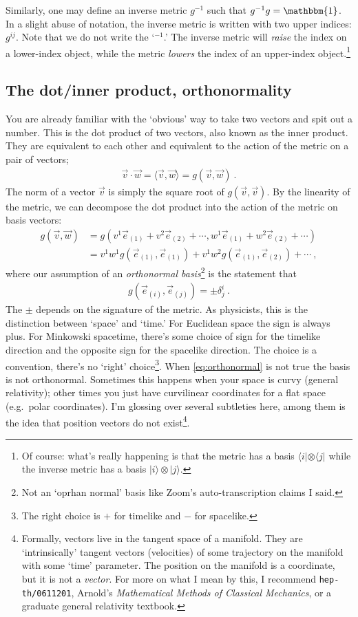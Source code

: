 Similarly, one may define an inverse metric $g^{-1}$ such that $g^{-1}g = \mathbbm{1}$. In a slight abuse of notation, the inverse metric is written with two upper indices: $g^{ij}$. Note that we do not write the `$^{-1}$.' The inverse metric will \emph{raise} the index on a lower-index object, while the metric \emph{lowers} the index of an upper-index object.\footnote{Of course: what’s really happening is that the metric has a basis $\langle i|\otimes \langle j|$ while the inverse metric has a basis $|i\rangle \otimes |j\rangle$.}


\subsection{The dot/inner product, orthonormality}

You are already familiar with the `obvious' way to take two vectors and spit out a number. This is the dot product of two vectors, also known as the inner product. They are equivalent to each other and equivalent to the action of the metric on a pair of vectors;
\begin{align}
  \vec v\cdot \vec w = \langle \vec v, \vec w \rangle = g(\vec v, \vec w) \ .
\end{align}
The norm of a vector $\vec v$ is simply the square root of $g(\vec v, \vec v)$. 
%
By the linearity of the metric, we can decompose the dot product into the action of the metric on basis vectors:
\begin{align}
  g(\vec v, \vec w) &= 
  g(
    v^1\vec e_{(1)} + v^2\vec e_{(2)} + \cdots,
    w^1\vec e_{(1)} + w^2\vec e_{(2)} + \cdots
  )
  \\
  &=
  v^1 w^1 g(\vec e_{(1)}, \vec e_{(1)}) + 
  v^1 w^2 g(\vec e_{(1)}, \vec e_{(2)}) + \cdots \ ,
\end{align}
where our assumption of an \emph{orthonormal basis}\footnote{Not an `oprhan normal' basis like Zoom's auto-transcription claims I said.} is the statement that
\begin{align}
  g(\vec e_{(i)}, \vec e_{(j)}) = \pm \delta^i_j \ .
  \label{eq:orthonormal}
\end{align}
The $\pm$ depends on the signature of the metric. As physicists, this is the distinction between `space' and `time.' For Euclidean space the sign is always plus. For Minkowski spacetime, there's some choice of sign for the timelike direction and the opposite sign for the spacelike direction. The choice is a convention, there's no `right' choice\footnote{The right choice is $+$ for timelike and $-$ for spacelike.}. When \eqref{eq:orthonormal} is not true the basis is not orthonormal. Sometimes this happens when your space is curvy (general relativity); other times you just have curvilinear coordinates for a flat space (e.g.~polar coordinates). I'm glossing over several subtleties here, among them is the idea that position vectors do not exist\footnote{Formally, vectors live in the tangent space of a manifold. They are `intrinsically' tangent vectors (velocities) of some trajectory on the manifold with some `time' parameter. The position on the manifold is a coordinate, but it is not a \emph{vector}. For more on what I mean by this, I recommend \texttt{hep-th/0611201}, Arnold's \emph{Mathematical Methods of Classical Mechanics}, or a graduate general relativity textbook.}.
